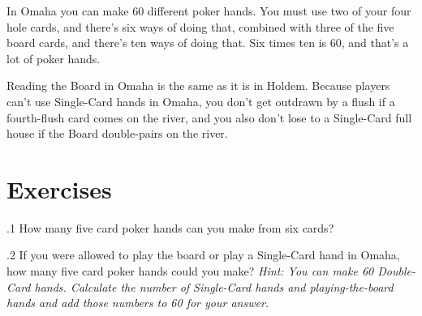In Omaha you can make 60 different poker hands. You must use two of
your four hole cards, and there's six ways of doing that, combined
with three of the five board cards, and there's ten ways of doing
that. Six times ten is 60, and that's a lot of poker hands.

Reading the Board in Omaha is the same as it is in Holdem. Because
players can't use Single-Card hands in Omaha, you don't get outdrawn
by a flush if a fourth-flush card comes on the river, and you also
don't lose to a Single-Card full house if the Board double-pairs on
the river.

\section{Exercises}

.1 How many five card poker hands can you make from
six cards?

.2 If you were allowed to play the board or play a
Single-Card hand in Omaha, how many five card poker hands could you
make? \textit{Hint: You can make 60 Double-Card hands. Calculate the
number of Single-Card hands and playing-the-board hands and add those
numbers to 60 for your answer.}

